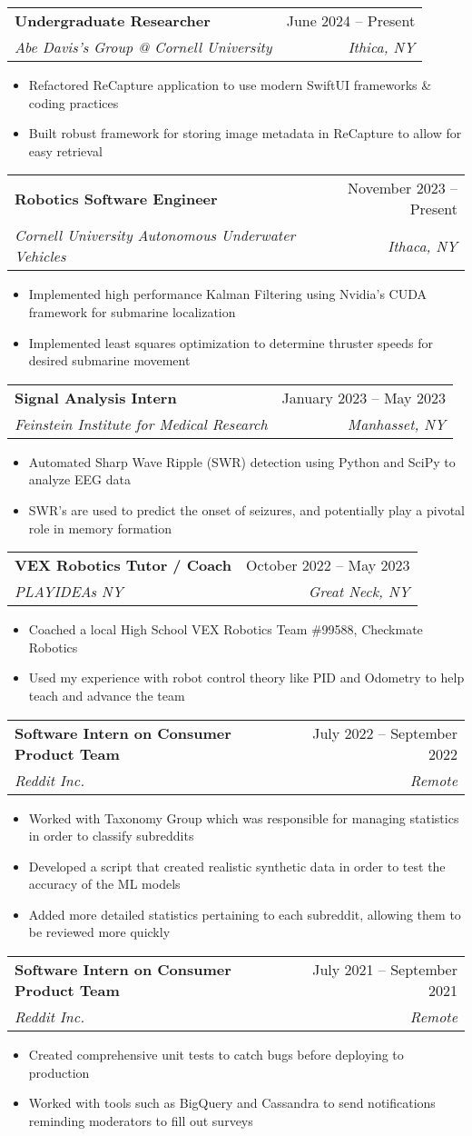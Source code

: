 \documentclass[letterpaper,11pt]{article}
\makeatletter
\newcommand{\resumeItem}[1]{
  \item\small{
    {#1 \vspace{-2pt}}
  }
}
\newcommand{\resumeSubheading}[4]{
  \vspace{2pt}\item
    \begin{tabular*}{0.97\textwidth}[t]{l@{\extracolsep{\fill}}r}
      \textbf{#1} & #2 \\
      \textit{\small#3} & \textit{\small #4} \\
    \end{tabular*}\vspace{-8pt}
}
\newcommand{\resumeItemListStart}{\begin{itemize}}
\newcommand{\resumeItemListEnd}{\end{itemize}\vspace{-5pt}}
\makeatother
\begin{document}
    \resumeSubheading
      {Undergraduate Researcher}{June 2024 -- Present}
      {Abe Davis's Group @ Cornell University}{Ithica, NY}
      \resumeItemListStart
        \resumeItem{Refactored ReCapture application to use modern SwiftUI frameworks \& coding practices}
        \resumeItem{Built robust framework for storing image metadata in ReCapture to allow for easy retrieval}
      \resumeItemListEnd
      
    \resumeSubheading
      {Robotics Software Engineer}{November 2023 -- Present}
      {Cornell University Autonomous Underwater Vehicles}{Ithaca, NY}
      \resumeItemListStart
        \resumeItem{Implemented high performance Kalman Filtering using Nvidia's CUDA framework for submarine localization}
        \resumeItem{Implemented least squares optimization to determine thruster speeds for desired submarine movement}
    \resumeItemListEnd

    \resumeSubheading
      {Signal Analysis Intern}{January 2023 -- May 2023}
      {Feinstein Institute for Medical Research}{Manhasset, NY}
      \resumeItemListStart
      \resumeItem{Automated Sharp Wave Ripple (SWR) detection using Python and SciPy to analyze EEG data}
      \resumeItem{SWR’s are used to predict the onset of seizures, and potentially play a pivotal role in memory formation}
    \resumeItemListEnd

    \resumeSubheading
      {VEX Robotics Tutor / Coach}{October 2022 -- May 2023}
      {PLAYIDEAs NY}{Great Neck, NY}
      \resumeItemListStart
      \resumeItem{Coached a local High School VEX Robotics Team \#99588, Checkmate Robotics}
      \resumeItem{Used my experience with robot control theory like PID and Odometry to help teach and advance the team}
    \resumeItemListEnd

    \resumeSubheading
      {Software Intern on Consumer Product Team}{July 2022 -- September 2022}
      {Reddit Inc.}{Remote}
      \resumeItemListStart
      \resumeItem{Worked with Taxonomy Group which was responsible for managing statistics in order to classify subreddits}
      \resumeItem{Developed a script that created realistic synthetic data in order to test the accuracy of the ML models}
      \resumeItem{Added more detailed statistics pertaining to each subreddit, allowing them to be reviewed more quickly}
    \resumeItemListEnd

    \resumeSubheading
      {Software Intern on Consumer Product Team}{July 2021 -- September 2021}
      {Reddit Inc.}{Remote}
      \resumeItemListStart
      \resumeItem{Created comprehensive unit tests to catch bugs before deploying to production}
      \resumeItem{Worked with tools such as BigQuery and Cassandra to send notifications reminding moderators to fill out surveys}
    \resumeItemListEnd
\end{document}
